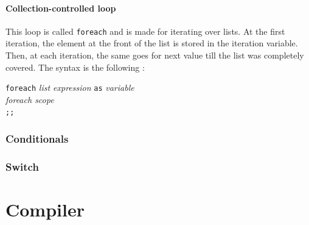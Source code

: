 \documentclass[a4paper,11pt]{article}
\begin{document}
\paragraph{Collection-controlled loop} This loop is called \texttt{foreach} and is made for iterating over lists. At the first iteration, the element at the front of the list is stored in the iteration variable. Then, at each iteration, the same goes for next value till the list was completely covered. The syntax is the following :
\begin{center}
	\begin{minipage}{0.35\linewidth}
		\texttt{foreach} \textit{list expression} \texttt{as} \textit{variable} \\
				\text{ }\text{ }\text{ }\text{ }\textit{foreach scope}\\
		\texttt{;;}\\
	\end{minipage}
\end{center}
\subsubsection{Conditionals}
\subsubsection{Switch}
\section{Compiler}
\label{sec:compiler}
\end{document}
